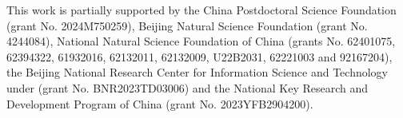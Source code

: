 \documentclass[lettersize,journal]{IEEEtran}
\begin{document}
This work is partially supported by the China Postdoctoral Science Foundation (grant No. 2024M750259), Beijing Natural Science Foundation (grant No. 4244084), National Natural Science Foundation of China (grants No. 62401075, 62394322, 61932016, 62132011, 62132009, U22B2031, 62221003 and 92167204), the Beijing National Research Center for Information Science and Technology under (grant No. BNR2023TD03006) and the National Key Research and Development Program of China (grant No. 2023YFB2904200).











 
%
%
\end{document}
